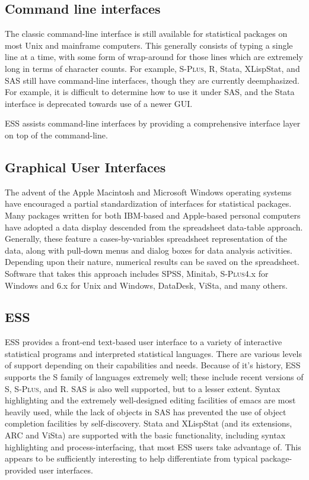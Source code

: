 \documentclass{article}
\newcommand*{\Splus}{\textsc{S-Plus}}
\begin{document}
\subsection{Command line interfaces}
\label{sec:UI:command}

The classic command-line interface is still available for statistical
packages on most Unix and mainframe computers.  This generally
consists of typing a single line at a time, with some form of
wrap-around for those lines which are extremely long in terms of
character counts.  For example, \Splus, R, Stata, XLispStat, and SAS
still have command-line interfaces, though they are currently deemphasized.
For example, it is difficult to determine how to use
it under SAS, and the Stata interface is deprecated towards use of a
newer GUI.

ESS assists command-line interfaces by providing a comprehensive
interface layer on top of the command-line.

\subsection{Graphical User Interfaces}
\label{sec:UI:GUI}

The advent of the Apple Macintosh and Microsoft Windows operating
systems have encouraged a partial standardization of interfaces for
statistical packages.  Many packages written for both IBM-based and
Apple-based personal computers have adopted a data display 
descended from the spreadsheet
data-table approach.  Generally, these feature a cases-by-variables
spreadsheet representation of the data, along with pull-down menus and
dialog boxes for data analysis activities.  Depending upon their
nature, numerical results can be saved on the spreadsheet.  Software
that takes this approach includes SPSS, Minitab, \Splus 4.x for Windows and 6.x for Unix and Windows,
DataDesk, ViSta, and many others.

\subsection{ESS}
\label{sec:UI:ESS}

ESS provides a front-end text-based user interface to a variety of
interactive statistical programs and interpreted statistical
languages.  There are various levels of support depending on their
capabilities and needs.  Because of it's history, ESS supports the S
family of languages extremely well; these include recent versions of
S, \Splus, and R.  SAS is also well supported, but to a lesser extent.
Syntax highlighting and the extremely well-designed editing facilities
of emacs are most heavily used, while the lack of objects in SAS has
prevented the use of object completion facilities by self-discovery.
Stata and XLispStat (and its extensions, ARC and ViSta) are supported
with the basic functionality, including syntax highlighting and
process-interfacing, that most ESS users take advantage of.  This
appears to be sufficiently interesting to help differentiate from
typical package-provided user interfaces.
\end{document}

